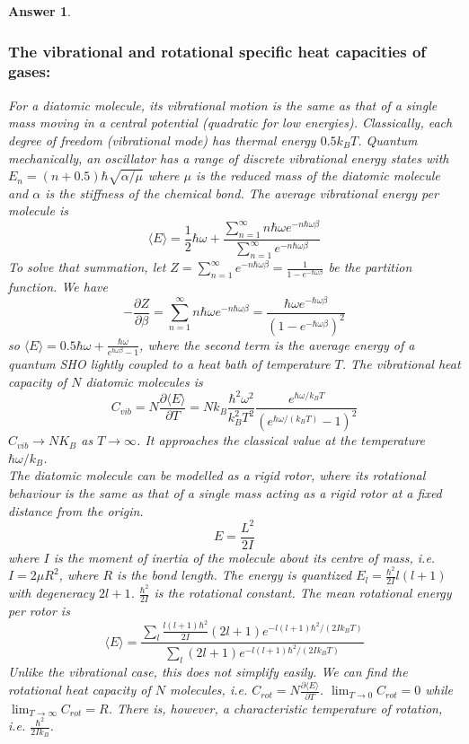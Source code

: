 \documentclass[a4paper]{article}
\newtheorem{ans}{Answer}[subsection]
\theoremstyle{new}
\begin{document}
\begin{ans}
\subsubsection*{The vibrational and rotational specific heat capacities of gases:}
For a diatomic molecule, its vibrational motion is the same as that of a single mass moving in a central potential (quadratic for low energies). Classically, each degree of freedom (vibrational mode) has thermal energy $0.5k_BT$. Quantum mechanically, an oscillator has a range of discrete vibrational energy states with $E_n=(n+0.5)\hbar\sqrt{\alpha/\mu}$ where $\mu$ is the reduced mass of the diatomic molecule and $\alpha$ is the stiffness of the chemical bond. The average vibrational energy per molecule is
$$\langle E\rangle=\frac{1}{2}\hbar\omega+\frac{\sum_{n=1}^\infty n\hbar\omega e^{-n\hbar\omega\beta}}{\sum_{n=1}^\infty e^{-n\hbar\omega\beta}}$$
To solve that summation, let $Z=\sum_{n=1}^\infty e^{-n\hbar\omega\beta}=\frac{1}{1-e^{-\hbar\omega\beta}}$ be the partition function. We have
$$-\frac{\partial Z}{\partial\beta}=\sum_{n=1}^\infty n\hbar\omega e^{-n\hbar\omega\beta}=\frac{\hbar\omega e^{-\hbar\omega\beta}}{(1-e^{-\hbar\omega\beta})^2}$$
so $\langle E\rangle=0.5\hbar\omega+\frac{\hbar\omega}{e^{\hbar\omega\beta}-1}$, where the second term is the average energy of a quantum SHO lightly coupled to a heat bath of temperature $T$. The vibrational heat capacity of $N$ diatomic molecules is
$$C_{vib}=N\frac{\partial\langle E\rangle}{\partial T}=Nk_B\frac{\hbar^2\omega^2}{k_B^2T^2}\frac{e^{\hbar\omega/k_BT}}{(e^{\hbar\omega/(k_BT)}-1)^2}$$
$C_{vib}\rightarrow NK_B$ as $T\rightarrow\infty$. It approaches the classical value at the temperature $\hbar\omega/k_B$.\\[5pt]
The diatomic molecule can be modelled as a rigid rotor, where its rotational behaviour is the same as that of a
single mass acting as a rigid rotor at a fixed distance
from the origin.
$$E=\frac{L^2}{2I}$$
where $I$ is the moment of inertia of the molecule about its centre of mass, i.e. $I=2\mu R^2$, where $R$ is the bond length. The energy is quantized $E_l=\frac{\hbar^2}{2I}l(l+1)$ with degeneracy $2l+1$. $\frac{\hbar^2}{2I}$ is the rotational constant. The mean rotational energy per rotor is
$$\langle E\rangle=\frac{\sum_l\frac{l(l+1)\hbar^2}{2I}(2l+1)e^{-l(l+1)\hbar^2/(2Ik_BT)}}{\sum_l(2l+1)e^{-l(l+1)\hbar^2/(2Ik_BT)}}$$
Unlike the vibrational case, this does not simplify easily. We can find the rotational heat capacity of $N$ molecules, i.e. $C_{rot}=N\frac{\partial\langle E\rangle}{\partial T}$. $\lim_{T\rightarrow0}C_{rot}=0$ while $\lim_{T\rightarrow\infty}C_{rot}=R$. There is, however, a characteristic temperature of rotation, i.e. $\frac{\hbar^2}{2Ik_B}$.\\[5pt]

\end{ans}
\end{document}
